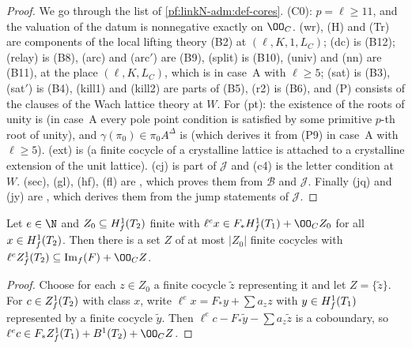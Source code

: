 \begin{proof}
We go through the list of \cref{pf:linkN-adm:def-cores}. (C0): $p=\ell\ge11$, and the valuation of the datum is
nonnegative exactly on $\OO_C$. (wr), (H) and (Tr) are components of the local lifting theory (B2) at $(\ell,K,1,L_C)$;
(dc) is (B12); (relay) is (B8), (arc) and (arc$'$) are (B9), (split) is (B10), (univ) and (nn) are (B11), at the place
$(\ell,K,L_C)$, which is in case~A with $\ell\ge5$; (sat) is (B3), (sat$'$) is (B4), (kill1) and (kill2) are parts of (B5),
(r2) is (B6), and (P) consists of the clauses of the Wach lattice theory at $W$. For (pt): the existence of the roots of
unity is  (in case~A every pole point condition is satisfied by some
primitive $p$-th root of unity), and $\gamma(\pi_0)\in\pi_0A^\Delta$ is
 (which derives it from (P9) in case~A with
$\ell\ge5$). (ext) is  (a finite cocycle of a crystalline lattice
is attached to a crystalline extension of the unit lattice). (cj) is part of $\mathcal J$ and (c4) is the letter condition
at $W$. (sec), (gl), (hf), (fl) are , which proves them from
$\mathcal B$ and $\mathcal J$. Finally (jq) and (jy) are ,
which derives them from the jump statements of $\mathcal J$.
\end{proof}

\begin{lemma}\label{pf:linkN-adm:cocycles}
Let $e\in\N$ and $Z_0\subseteq H^1_{f}(T_2)$ finite with $\ell^ex\in F_*\linkNadmHf(T_1)+\OO_CZ_0$ for all
$x\in H^1_{f}(T_2)$. Then there is a set $Z$ of at most $|Z_0|$ finite cocycles with
$\ell^e\linkNadmZf(T_2)\subseteq\linkNadmIm(F)+\OO_CZ$.
\end{lemma}

\begin{proof}
Choose for each $z\in Z_0$ a finite cocycle $\tilde z$ representing it and let $Z=\{\tilde z\}$. For $c\in Z^1_{f}(T_2)$
with class $x$, write $\ell^ex=F_*y+\sum a_zz$ with $y\in H^1_{f}(T_1)$ represented by a finite cocycle $\tilde y$. Then
$\ell^ec-F_*\tilde y-\sum a_z\tilde z$ is a coboundary, so $\ell^ec\in F_*\linkNadmZf(T_1)+B^1(T_2)+\OO_CZ$.
\end{proof}

